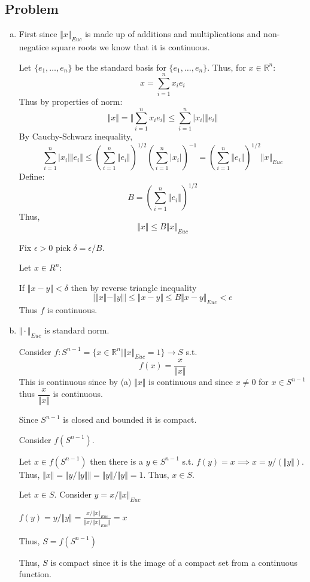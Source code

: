 \documentclass[12pt, letterpaper]{article}
\newcounter{problem}
\newcommand{\q}{
    \newpage %
    \stepcounter{problem} %
    \subsection*{Problem \arabic{problem}} %
}
\newcommand{\R}{\mathbb{R}}
\begin{document}
\q
\begin{enumerate}[(a)]
    \item First since $\Vert x \Vert_{Euc}$ is made up of additions and multiplications and non-negatice square roots we know that it is continuous.
    
    Let $\{e_1,\dots,e_n\}$ be the standard basis for $\{e_1,\dots,e_n\}$. Thus, for $x \in \R^n$:
    \[x = \sum_{i=1}^n x_ie_i\]
    Thus by properties of norm:
    \[\Vert x \Vert = \Vert \sum_{i=1}^n x_ie_i \Vert \leq \sum_{i=1}^n |x_i|\Vert e_i \Vert \]
    By Cauchy-Schwarz inequality,
    \[\sum_{i=1}^n |x_i|\Vert e_i \Vert \leq \left( \sum_{i=1}^n \Vert e_i \Vert \right)^{1/2}\left( \sum_{i=1}^n |x_i| \right)^{-1}=\left( \sum_{i=1}^n \Vert e_i \Vert \right)^{1/2}\Vert x \Vert_{Euc}\]
    Define:
    \[B=\left( \sum_{i=1}^n \Vert e_i \Vert \right)^{1/2}\]
    Thus,
    \[\Vert x \Vert \leq B \Vert x \Vert_{Euc}\]

    Fix $\epsilon > 0$ pick $\delta = \epsilon/B$.

    Let $x \in R^n$:

    If $\Vert x-y \Vert < \delta$ then by reverse triangle inequality
    \[|\Vert x \Vert - \Vert y \Vert| \leq \Vert x -y \Vert \leq B\Vert x-y \Vert_{Euc} < e\]
    Thus $f$ is continuous.

    \item $\Vert \cdot \Vert_{Euc}$ is standard norm.
    
    Consider $f:S^{n-1}=\{x \in \R^n \mid \Vert x \Vert_{Euc} = 1\} \to S$ s.t.
    \[f(x)=\dfrac{x}{\Vert x \Vert}\]
    This is continuous since by (a) $\Vert x \Vert$ is continuous and since $x \neq 0$ for $x \in S^{n-1}$ thus $\dfrac{x}{\Vert x \Vert}$ is continuous.

    Since $S^{n-1}$ is closed and bounded it is compact.

    Consider $f(S^{n-1})$. 
    
    Let $x \in f(S^{n-1})$ then there is a $y \in S^{n-1}$ s.t. $f(y)=x \implies x=y/(\Vert y \Vert)$. Thus, $\Vert x \Vert= \Vert y/\Vert y \Vert \Vert=\Vert y \Vert/\Vert y \Vert=1$. Thus, $x \in S$.

    Let $x \in S$. Consider $y=x/\Vert x \Vert_{Euc}$

    $f(y)=y/ \Vert y \Vert = \frac{x/\Vert x \Vert_{Euc}}{\Vert x/\Vert x \Vert_{Euc} \Vert}=x$

    Thus, $S=f(S^{n-1})$

    Thus, $S$ is compact since it is the image of a compact set from a continuous function.


\end{enumerate}
\end{document}
